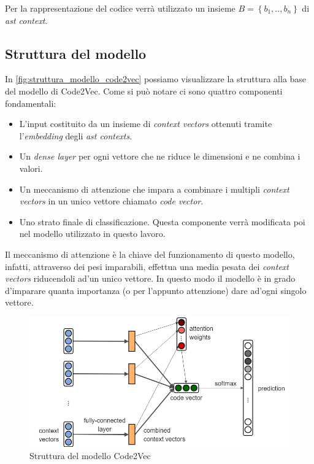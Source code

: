 Per la rappresentazione del codice verrà utilizzato un insieme $B = \left\{b_1, .., b_n \right\}$ di \textit{ast context}.

\subsection{Struttura del modello}
In \autoref{fig:struttura_modello_code2vec} possiamo visualizzare la struttura alla base del modello di Code2Vec.
Come si può notare ci sono quattro componenti fondamentali:
    \begin{itemize}
        \item L'input costituito da un insieme di \textit{context vectors} ottenuti tramite l'\textit{embedding} degli \textit{ast contexts}. 
        \item Un \textit{dense layer} per ogni vettore che ne riduce le dimensioni e ne combina i valori.  
        \item Un meccanismo di attenzione che impara a combinare i multipli \textit{context vectors} in un unico vettore chiamato \textit{code vector}.
        \item Uno strato finale di classificazione. Questa componente verrà modificata poi nel modello utilizzato in questo lavoro.
    \end{itemize}
Il meccanismo di attenzione è la chiave del funzionamento di questo modello, infatti, attraverso dei pesi imparabili, effettua una media pesata dei \textit{context vectors} riducendoli ad'un unico vettore.
In questo modo il modello è in grado d'imparare quanta importanza (o per l'appunto attenzione) dare ad'ogni singolo vettore.  
\begin{figure}[h]
    \centering
    \includegraphics[scale=0.35]{images/modellocode2vec.png}
    \caption{Struttura del modello Code2Vec}
    \label{fig:struttura_modello_code2vec}
\end{figure}